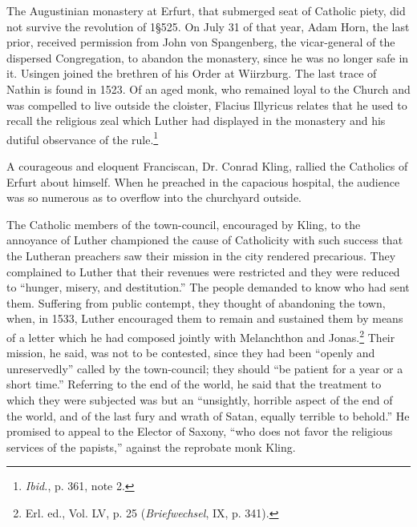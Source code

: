 The Augustinian monastery at Erfurt, that submerged seat of
Catholic piety, did not survive the revolution of 1§525. On July
31 of that year, Adam Horn, the last prior, received permission
from John von Spangenberg, the vicar-general of the dispersed
Congregation, to abandon the monastery, since he was no longer
safe in it. Usingen joined the brethren of his Order at Wiirzburg.
The last trace of Nathin is found in 1523. Of an aged monk, who
remained loyal to the Church and was compelled to live outside
the cloister, Flacius Illyricus relates that he used to recall the religious
zeal which Luther had displayed in the monastery and his dutiful observance
of the rule.\footnote{\textit{Ibid.}, p. 361, note 2.}

A courageous and eloquent Franciscan, Dr. Conrad Kling, rallied
the Catholics of Erfurt about himself. When he preached in the
capacious hospital, the audience was so numerous as to overflow
into the churchyard outside.

The Catholic members of the town-council, encouraged by Kling,
to the annoyance of Luther championed the cause of Catholicity
with such success that the Lutheran preachers saw their mission in
the city rendered precarious. They complained to Luther that their
revenues were restricted and they were reduced to “hunger, misery,
and destitution.” The people demanded to know who had sent
them. Suffering from public contempt, they thought of abandoning the town,
when, in 1533, Luther encouraged them to remain and
sustained them by means of a letter which he had composed jointly
with Melanchthon and Jonas.\footnote{Erl. ed., Vol. LV, p. 25 (\textit{Briefwechsel}, IX, p. 341).}
Their mission, he said, was not to
be contested, since they had been “openly and unreservedly” called
by the town-council; they should “be patient for a year or a short
time.” Referring to the end of the world, he said that the treatment
to which they were subjected was but an “unsightly, horrible
aspect of the end of the world, and of the last fury and wrath of
Satan, equally terrible to behold.” He promised to appeal to the
Elector of Saxony, “who does not favor the religious services of the
papists,” against the reprobate monk Kling.

